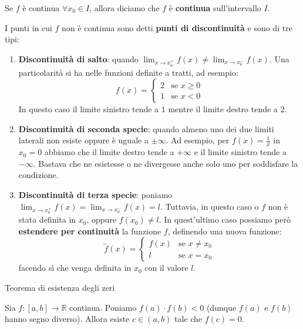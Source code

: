 \documentclass[12pt]{report}
\newcommand{\R}{\mathbb{R}}
\begin{document}
	Se $f$ è continua $\forall x_0 \in I$, allora diciamo che $f$ è \textbf{continua} sull'intervallo $I$.
	
	I punti in cui $f$ non è continua sono detti \textbf{punti di discontinuità} e sono di tre tipi:
	
	\begin{enumerate}
		
		\item \textbf{Discontinuità di salto}: quando $\lim_{x \to x_0^+} f(x) \neq \lim_{x \to x_0^-} f(x)$. Una particolarità si ha nelle funzioni definite a tratti, ad esempio:
		\[
		f(x) = 
		\begin{cases}
			2 & \text{se } x \geq 0 \\
			1 & \text{se } x < 0
		\end{cases}
		\]
		In questo caso il limite sinistro tende a $1$ mentre il limite destro tende a $2$.
		
		\item \textbf{Discontinuità di seconda specie}: quando almeno uno dei due limiti laterali non esiste oppure è uguale a $\pm \infty$. Ad esempio, per $f(x) = \frac{1}{x}$ in $x_0 = 0$ abbiamo che il limite destro tende a $+\infty$ e il limite sinistro tende a $-\infty$. Bastava che ne esistesse o ne divergesse anche solo uno per soddisfare la condizione.
		
		\item \textbf{Discontinuità di terza specie}: poniamo $\lim_{x \to x_0^+} f(x) = \lim_{x \to x_0^-} f(x) = l$. Tuttavia, in questo caso o $f$ non è stata definita in $x_0$, oppure $f(x_0) \neq l$.
		In quest'ultimo caso possiamo però \textbf{estendere per continuità} la funzione $f$, definendo una nuova funzione:
		\[
		\tilde{f}(x) = 
		\begin{cases}
			f(x) & \text{se } x \neq x_0 \\
			l & \text{se } x = x_0
		\end{cases}
		\]
		facendo sì che venga definita in $x_0$ con il valore $l$.
		
	\end{enumerate}

	\begin{teorema}{Teorema di esistenza degli zeri}{}
		
		Sia $f: [a, b] \to \R$ continua. Poniamo $f(a) \cdot f(b) < 0$ (dunque $f(a)$ e $f(b)$ hanno segno diverso).
		Allora esiste $c \in (a, b)$ tale che $f(c) = 0$.
		
	\end{teorema}
	
\end{document}
